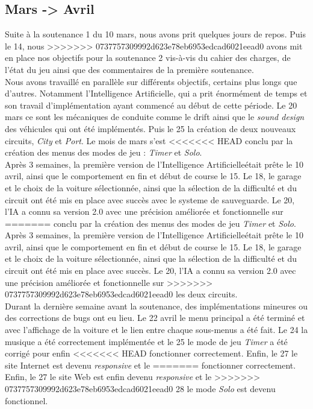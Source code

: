 \documentclass[a4paper,12pt]{article}
\newcommand{\AI}{Intelligence Artificielle}
\begin{document}
        \subsection{Mars -> Avril}
            Suite à la soutenance 1 du 10 mars, nous avons prit quelques jours de repos. Puis le 14, nous
>>>>>>> 0737757309992d623e78eb6953edcad6021eead0
            avons mit en place nos objectifs pour la soutenance 2 vis-à-vis du cahier des charges, de
            l'état du jeu ainsi que des commentaires de la première soutenance.\\
            Nous avons travaillé en parallèle sur différents objectifs, certains plus longs que d'autres.
            Notamment l'\AI, qui a prit énormément de temps et son travail d'implémentation ayant
            commencé au début de cette période. Le 20 mars ce sont les mécaniques de conduite comme le
            drift ainsi que le \textit{sound design} des véhicules qui ont été implémentés. Puis le 25 la
            création de deux nouveaux circuits, \textsl{City} et \textsl{Port}. Le mois de mars s'est
<<<<<<< HEAD
            conclu par la création des menus des modes de jeu : \textsl{Timer} et \textsl{Solo}.\\
            Après 3 semaines, la première version de l'\AI était prête le 10 avril, ainsi que le
            comportement en fin et début de course le 15. Le 18, le garage et le choix de la voiture 
            sélectionnée, ainsi que la sélection de la difficulté et du circuit ont été mis en place avec
            succès avec le systeme de sauveguarde. Le 20, l'IA a connu sa version 2.0 avec une précision améliorée et fonctionnelle sur
=======
            conclu par la création des menus des modes de jeu \textsl{Timer} et \textsl{Solo}.\\
            Après 3 semaines, la première version de l'\AI était prête le 10 avril, ainsi que le
            comportement en fin et début de course le 15. Le 18, le garage et le choix de la voiture 
            sélectionnée, ainsi que la sélection de la difficulté et du circuit ont été mis en place avec
            succès. Le 20, l'IA a connu sa version 2.0 avec une précision améliorée et fonctionnelle sur
>>>>>>> 0737757309992d623e78eb6953edcad6021eead0
            les deux circuits.\\
            Durant la dernière semaine avant la soutenance, des implémentations mineures ou des
            corrections de bugs ont eu lieu. Le 22 avril le menu principal a été terminé et avec
            l'affichage de la voiture et le lien entre chaque sous-menus a été fait. Le 24 la musique a
            été correctement implémentée et le 25 le mode de jeu \textsl{Timer} a été corrigé pour enfin
<<<<<<< HEAD
            fonctionner correctement. Enfin, le 27 le site Internet est devenu \textit{responsive} et le
=======
            fonctionner correctement. Enfin, le 27 le site Web est enfin devenu \textit{responsive} et le
>>>>>>> 0737757309992d623e78eb6953edcad6021eead0
            28 le mode \textsl{Solo} est devenu fonctionnel.
\end{document}
